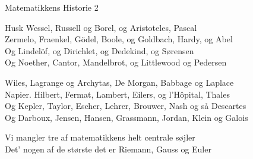 \begin{song}{Matematikkens Historie 2}
  \begin{SBVerse}
    Husk Wessel, Russell og Borel, og Aristoteles, Pascal\\
    Zermelo, Fraenkel, Gödel, Boole, og Goldbach, Hardy, og Abel\\
    Og Lindelöf, og Dirichlet, og Dedekind, og Sørensen\\
    Og Noether, Cantor, Mandelbrot, og Littlewood og Pedersen 
  \end{SBVerse}

  \begin{SBVerse}
    Wiles, Lagrange og Archytas, De Morgan, Babbage og Laplace\\
    Napier. Hilbert, Fermat, Lambert, Eilers, og l'Hôpital, Thales\\
    Og Kepler, Taylor, Escher, Lehrer, Brouwer, Nash og så Descartes\\
    Og Darboux, Jensen, Hansen, Grassmann, Jordan, Klein og Galois
  \end{SBVerse}

  \begin{SBVerse}
    Vi mangler tre af matematikkens helt centrale søjler\\
    Det' nogen af de største det er Riemann, Gauss og Euler
  \end{SBVerse}
\end{song}
